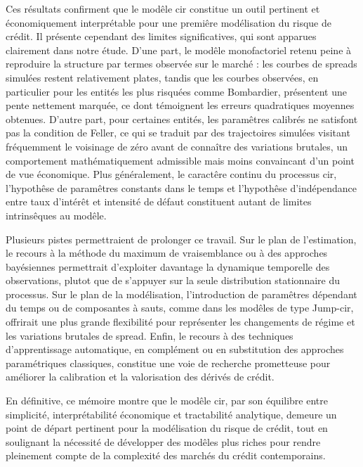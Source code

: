 Ces résultats confirment que le modêle \gls{cir} constitue un outil pertinent et
économiquement interprétable pour une premiêre modélisation du risque de
crédit. Il présente cependant des limites significatives, qui sont
apparues clairement dans notre étude. D'une part, le modêle monofactoriel
retenu peine à reproduire la structure par termes observée sur le
marché : les courbes de spreads simulées restent relativement plates,
tandis que les courbes observées, en particulier pour les entités les plus
risquées comme Bombardier, présentent une pente nettement marquée, ce dont
témoignent les erreurs quadratiques moyennes obtenues. D'autre part, pour
certaines entités, les paramêtres calibrés ne satisfont pas la condition
de Feller, ce qui se traduit par des trajectoires simulées visitant
fréquemment le voisinage de zéro avant de connaître des variations
brutales, un comportement mathématiquement admissible mais moins convaincant
d'un point de vue économique. Plus généralement, le caractêre continu du
processus \gls{cir}, l'hypothêse de paramêtres constants dans le temps et
l'hypothêse d'indépendance entre taux d'intérêt et intensité de défaut
constituent autant de limites intrinsêques au modêle.

Plusieurs pistes permettraient de prolonger ce travail. Sur le plan de
l'estimation, le recours à la méthode du maximum de vraisemblance ou à des
approches bayésiennes permettrait d'exploiter davantage la dynamique
temporelle des observations, plutot que de s'appuyer sur la seule
distribution stationnaire du processus. Sur le plan de la modélisation,
l'introduction de paramêtres dépendant du temps ou de composantes à sauts,
comme dans les modêles de type Jump-\gls{cir}, offrirait une plus grande
flexibilité pour représenter les changements de régime et les variations
brutales de spread. Enfin, le recours à des techniques d'apprentissage
automatique, en complément ou en substitution des approches paramétriques
classiques, constitue une voie de recherche prometteuse pour améliorer la
calibration et la valorisation des dérivés de crédit.

En définitive, ce mémoire montre que le modêle \gls{cir}, par son équilibre
entre simplicité, interprétabilité économique et tractabilité
analytique, demeure un point de départ pertinent pour la modélisation du
risque de crédit, tout en soulignant la nécessité de développer des
modêles plus riches pour rendre pleinement compte de la complexité des
marchés du crédit contemporains.
